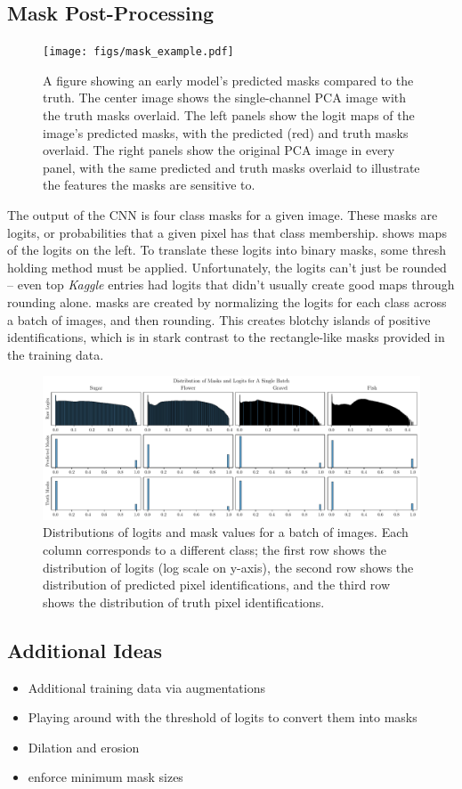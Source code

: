 \subsection{Mask Post-Processing}
\begin{figure}[htbp]
    \centering
    \texttt{[image: figs/mask\_example.pdf]}
    \caption{A figure showing an early model's predicted masks compared to the truth. The center image shows the single-channel PCA image with the truth masks overlaid. The left panels show the logit maps of the image's predicted masks, with the predicted (red) and truth masks overlaid. The right panels show the original PCA image in every panel, with the same predicted and truth masks overlaid to illustrate the features the masks are sensitive to.}
    \label{fig:vis_mask}
\end{figure}
% 
The output of the CNN is four class masks for a given image. These masks are logits, or probabilities that a given pixel has that class membership.  shows maps of the logits on the left. To translate these logits into binary masks, some thresh holding method must be applied. Unfortunately, the logits can't just be rounded -- even top \textit{Kaggle} entries had logits that didn't usually create good maps through rounding alone.  masks are created by normalizing the logits for each class across a batch of images, and then rounding. This creates blotchy islands of positive identifications, which is in stark contrast to the rectangle-like masks provided in the training data. 

\begin{figure}[htbp]
    \centering
    \includegraphics[width=\linewidth]{figs/logit_hist.pdf}
    \caption{Distributions of logits and mask values for a batch of images. Each column corresponds to a different class; the first row shows the distribution of logits (log scale on y-axis), the second row shows the distribution of predicted pixel identifications, and the third row shows the distribution of truth pixel identifications.}
    \label{fig:logit_hists}
\end{figure}

\subsection{Additional Ideas}
\begin{itemize}
    \item Additional training data via augmentations 
    \item Playing around with the threshold of logits to convert them into masks 
    \item Dilation and erosion
    \item enforce minimum mask sizes 
\end{itemize}